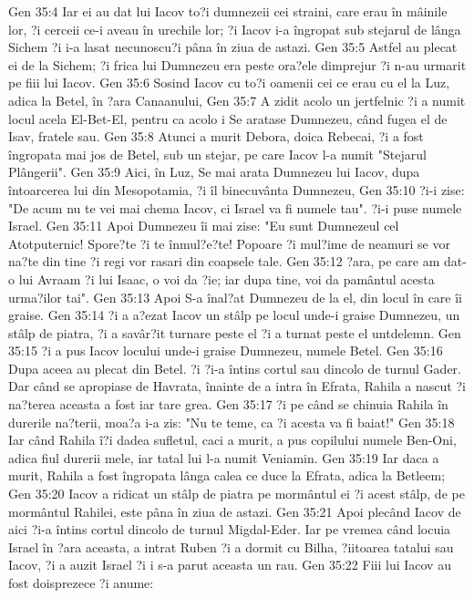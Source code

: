 Gen 35:4  Iar ei au dat lui Iacov to?i dumnezeii cei straini, care erau în mâinile lor, ?i cerceii ce-i aveau în urechile lor; ?i Iacov i-a îngropat sub stejarul de lânga Sichem ?i i-a lasat necunoscu?i pâna în ziua de astazi.
Gen 35:5  Astfel au plecat ei de la Sichem; ?i frica lui Dumnezeu era peste ora?ele dimprejur ?i n-au urmarit pe fiii lui Iacov.
Gen 35:6  Sosind Iacov cu to?i oamenii cei ce erau cu el la Luz, adica la Betel, în ?ara Canaanului,
Gen 35:7  A zidit acolo un jertfelnic ?i a numit locul acela El-Bet-El, pentru ca acolo i Se aratase Dumnezeu, când fugea el de Isav, fratele sau.
Gen 35:8  Atunci a murit Debora, doica Rebecai, ?i a fost îngropata mai jos de Betel, sub un stejar, pe care Iacov l-a numit "Stejarul Plângerii".
Gen 35:9  Aici, în Luz, Se mai arata Dumnezeu lui Iacov, dupa întoarcerea lui din Mesopotamia, ?i îl binecuvânta Dumnezeu,
Gen 35:10  ?i-i zise: "De acum nu te vei mai chema Iacov, ci Israel va fi numele tau". ?i-i puse numele Israel.
Gen 35:11  Apoi Dumnezeu îi mai zise: "Eu sunt Dumnezeul cel Atotputernic! Spore?te ?i te înmul?e?te! Popoare ?i mul?ime de neamuri se vor na?te din tine ?i regi vor rasari din coapsele tale.
Gen 35:12  ?ara, pe care am dat-o lui Avraam ?i lui Isaac, o voi da ?ie; iar dupa tine, voi da pamântul acesta urma?ilor tai".
Gen 35:13  Apoi S-a înal?at Dumnezeu de la el, din locul în care îi graise.
Gen 35:14  ?i a a?ezat Iacov un stâlp pe locul unde-i graise Dumnezeu, un stâlp de piatra, ?i a savâr?it turnare peste el ?i a turnat peste el untdelemn.
Gen 35:15  ?i a pus Iacov locului unde-i graise Dumnezeu, numele Betel.
Gen 35:16  Dupa aceea au plecat din Betel. ?i ?i-a întins cortul sau dincolo de turnul Gader. Dar când se apropiase de Havrata, înainte de a intra în Efrata, Rahila a nascut ?i na?terea aceasta a fost iar tare grea.
Gen 35:17  ?i pe când se chinuia Rahila în durerile na?terii, moa?a i-a zis: "Nu te teme, ca ?i acesta va fi baiat!"
Gen 35:18  Iar când Rahila î?i dadea sufletul, caci a murit, a pus copilului numele Ben-Oni, adica fiul durerii mele, iar tatal lui l-a numit Veniamin.
Gen 35:19  Iar daca a murit, Rahila a fost îngropata lânga calea ce duce la Efrata, adica la Betleem;
Gen 35:20  Iacov a ridicat un stâlp de piatra pe mormântul ei ?i acest stâlp, de pe mormântul Rahilei, este pâna în ziua de astazi.
Gen 35:21  Apoi plecând Iacov de aici ?i-a întins cortul dincolo de turnul Migdal-Eder. Iar pe vremea când locuia Israel în ?ara aceasta, a intrat Ruben ?i a dormit cu Bilha, ?iitoarea tatalui sau Iacov, ?i a auzit Israel ?i i s-a parut aceasta un rau.
Gen 35:22  Fiii lui Iacov au fost doisprezece ?i anume:
